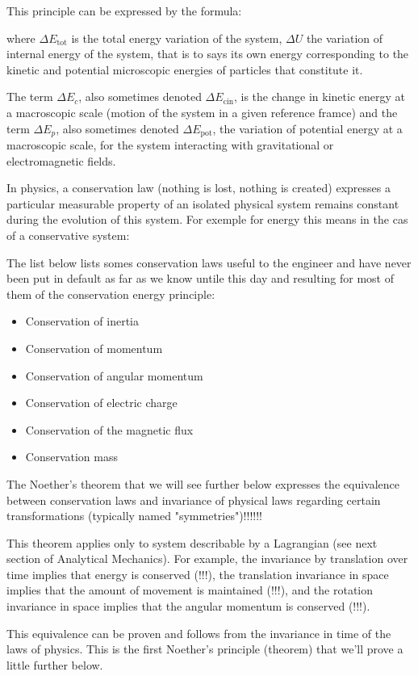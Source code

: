 	This principle can be expressed by the formula:
	 
	where $\Delta E_\text{tot}$ is the total energy variation of the system, $\Delta U$ the variation of internal energy of the system, that is to says its own energy corresponding to the kinetic and potential microscopic energies of particles that constitute it.

	The term $\Delta E_c$, also sometimes denoted $\Delta E_\text{cin}$, is the change in kinetic energy at a macroscopic scale (motion of the system in a given reference framce) and the term $\Delta E_p$, also sometimes denoted $\Delta E_\text{pot}$,  the variation of potential energy at a macroscopic scale, for the system interacting with gravitational or electromagnetic fields.

	In physics, a conservation law (nothing is lost, nothing is created) expresses a particular measurable property of an isolated physical system remains constant during the evolution of this system. For exemple for energy this means in the cas of a conservative system:
	 
	The list below lists somes conservation laws useful to the engineer and have never been put in default as far as we know untile this day and resulting for most of them of the conservation energy principle:
	\begin{itemize}
		\item Conservation of inertia
		\item Conservation of momentum
		\item Conservation of angular momentum
		\item Conservation of electric charge
		\item Conservation of the magnetic flux
   		\item Conservation mass
	\end{itemize}
	The Noether's theorem that we will see further below expresses the equivalence between conservation laws and invariance of physical laws regarding certain transformations (typically named "symmetries")!!!!!! 

	This theorem applies only to system describable by a Lagrangian (see next section of Analytical Mechanics). For example, the invariance by translation over time implies that energy is conserved (!!!), the translation invariance in space implies that the amount of movement is maintained (!!!), and the rotation invariance in space implies that the angular momentum is conserved (!!!).
	
	This equivalence can be proven and follows from the invariance in time of the laws of physics. This is the first Noether's principle (theorem) that we'll prove a little further below.

